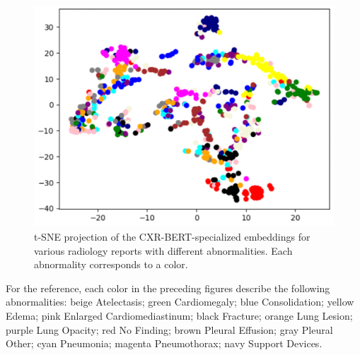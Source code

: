 \documentclass{article}
\begin{document}
\begin{figure}[hbt!]
  \centering
    \includegraphics[width=130mm]{clusters_microsoft.png}
  \caption{t-SNE projection of the CXR-BERT-specialized embeddings for various radiology reports with different abnormalities. Each abnormality corresponds to a color.}
  \label{clusters-microsoft}
\end{figure}

For the reference, each color in the preceding figures describe the following abnormalities: beige Atelectasis; green Cardiomegaly; blue Consolidation; yellow Edema; pink Enlarged Cardiomediastinum; black Fracture; orange Lung Lesion; purple Lung Opacity; red No Finding; brown Pleural Effusion; gray Pleural Other; cyan Pneumonia; magenta Pneumothorax; navy Support Devices.
\end{document}
